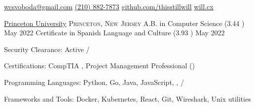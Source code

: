 \documentclass[10pt,letterpaper]{article}
\begin{document}
\sloppy


\nobreakvspace{0.3em}

\noindent\href{mailto:wcsvoboda.at.gmail.dot.com}{wcsvoboda\mbox{}@\mbox{}gmail.com}\sbull
\href{tel:2108827873}{(210) 882-7873}\sbull
\href{https://github.com/thisstillwill}{github.com/thisstillwill}\sbull
\href{https://will.cx}{will.cx}

\spacedhrule{0.9em}{-0.4em}


\headedsection
  {\href{https://www.princeton.edu/}{Princeton University}}
  {\textsc{Princeton, New Jersey}} {%
  \headedsubsection
    {A.B. in Computer Science \textnormal{(3.44 )}}
    {May 2022}
    {}
  \headedsubsection
    {Certificate in Spanish Language and Culture \textnormal{(3.93 )}}
    {May 2022}{}
}


\spacedhrule{0.5em}{-0.4em}


\inlineheadsection
  {Security Clearance:}
  {Active /}

\inlineheadsection
  {Certifications:} 
  {CompTIA \SP, Project Management Professional ()}

\inlineheadsection
  {Programming Languages:}
  {Python, Go, Java, JavaScript, , /}

\inlineheadsection
  {Frameworks and Tools:}
  {Docker, Kubernetes, React, Git, Wireshark, Unix utilities}
\end{document}

